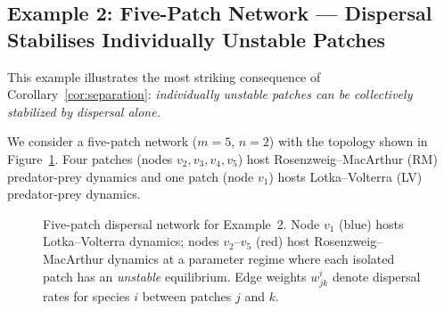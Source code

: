 \documentclass[12pt,a4paper]{article}
\theoremstyle{definition}
\begin{document}
\subsection*{Example 2: Five-Patch Network --- Dispersal Stabilises   Individually Unstable Patches}
\label{subsec:ex2}

This example illustrates the most striking consequence of
Corollary~\ref{cor:separation}: \emph{individually unstable patches
can be collectively stabilized by dispersal alone.}


We consider a five-patch network ($m=5$, $n=2$) with the topology
shown in Figure~\ref{fig:5patch}.
Four patches (nodes $v_2, v_3, v_4, v_5$) host
Rosenzweig--MacArthur (RM) predator-prey
dynamics and one patch (node $v_1$)
hosts Lotka--Volterra (LV) predator-prey dynamics.

\begin{figure}[ht]
\centering
{}
\caption{Five-patch dispersal network for Example~2.
  Node $v_1$ (blue) hosts Lotka--Volterra dynamics; nodes $v_2$--$v_5$
  (red) host Rosenzweig--MacArthur dynamics at a parameter regime
  where each isolated patch has an \emph{unstable} equilibrium.
  Edge weights $w^i_{jk}$ denote dispersal rates for species $i$
  between patches $j$ and $k$.}
\label{fig:5patch}
\end{figure}
\end{document}
